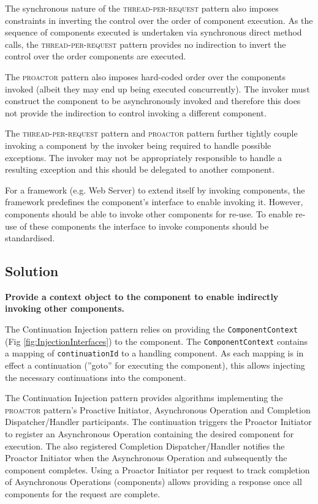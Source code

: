 \documentclass[prodmode]{style/acmlarge}
\begin{document}
The synchronous nature of the \textsc{thread-per-request} pattern also imposes
constraints in inverting the control over the order of component execution.  As
the sequence of components executed is undertaken via synchronous direct method
calls, the \textsc{thread-per-request} pattern provides no indirection to invert
the control over the order components are executed.

The \textsc{proactor} pattern also imposes hard-coded order over the components
invoked (albeit they may end up being executed concurrently).  The invoker must
construct the component to be asynchronously invoked and therefore this does not
provide the indirection to control invoking a different component.

The \textsc{thread-per-request} pattern and \textsc{proactor} pattern further
tightly couple invoking a component by the invoker being required to handle
possible exceptions.  The invoker may not be appropriately responsible to handle
a resulting exception and this should be delegated to another component.

For a framework (e.g. Web Server) to extend itself by invoking components, the
framework predefines the component's interface to enable invoking it.  However,
components should be able to invoke other components for re-use.  To enable
re-use of these components the interface to invoke components should be
standardised.


\subsection{Solution}

\textbf{Provide a context object to the component to enable indirectly invoking other components.}

The Continuation Injection pattern relies on providing the
\texttt{ComponentContext} (Fig \ref{fig:InjectionInterfaces}) to the component.
The \texttt{ComponentContext} contains a mapping of \texttt{continuationId} to a
handling component.  As each mapping is in effect a continuation (''goto'' for
executing the component), this allows injecting the necessary continuations into
the component.

The Continuation Injection pattern provides algorithms implementing the
\textsc{proactor} pattern's Proactive Initiator, Asynchronous Operation and
Completion Dispatcher/Handler participants.  The continuation triggers the
Proactor Initiator to register an Asynchronous Operation containing the desired
component for execution.  The also registered Completion Dispatcher/Handler
notifies the Proactor Initiator when the Asynchronous Operation and subsequently
the component completes.  Using a Proactor Initiator per request to track
completion of Asynchronous Operations (components) allows providing a response
once all components for the request are complete.
\end{document}

